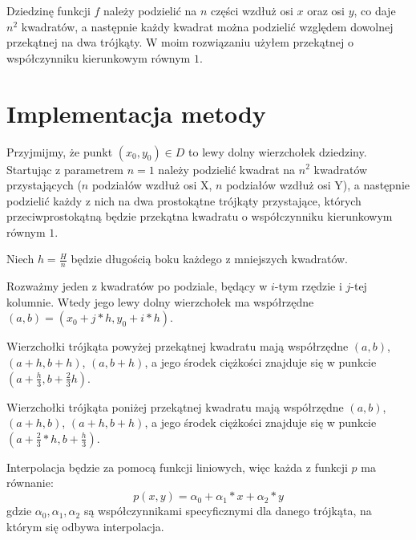 \documentclass[12pt]{article}
\begin{document}
	Dziedzinę funkcji $f$ należy podzielić na $n$ części wzdłuż osi $x$ oraz osi $y$, co daje $n^2$ kwadratów, a następnie każdy kwadrat można podzielić względem dowolnej przekątnej na dwa trójkąty. W moim rozwiązaniu użyłem przekątnej o współczynniku kierunkowym równym $1$.
	
	\section{Implementacja metody}
	Przyjmijmy, że punkt $(x_0, y_0) \in D$ to lewy dolny wierzchołek dziedziny. Startując z parametrem $n = 1$ należy podzielić kwadrat na $n^2$ kwadratów przystających ($n$ podziałów wzdłuż osi X, $n$ podziałów wzdłuż osi Y), a następnie podzielić każdy z nich na dwa prostokątne trójkąty przystające, których przeciwprostokątną będzie przekątna kwadratu o współczynniku kierunkowym równym $1$.
	
	Niech $h = \frac{H}{n}$ będzie długością boku każdego z mniejszych kwadratów.
	
	Rozważmy jeden z kwadratów po podziale, będący w $i$-tym rzędzie i $j$-tej kolumnie. Wtedy jego lewy dolny wierzchołek ma współrzędne $(a, b) = (x_0 + j*h, y_0 + i*h)$.
	
	Wierzchołki trójkąta powyżej przekątnej kwadratu mają współrzędne $(a, b)$, $(a + h, b + h)$, $(a, b + h)$, a jego środek ciężkości znajduje się w punkcie $(a + \frac{h}{3}, b + \frac{2}{3}h)$.
	
	Wierzchołki trójkąta poniżej przekątnej kwadratu mają współrzędne $(a, b)$, $(a + h, b)$, $(a + h, b + h)$, a jego środek ciężkości znajduje się w punkcie $(a + \frac{2}{3}*h, b + \frac{h}{3})$.
	
	Interpolacja będzie za pomocą funkcji liniowych, więc każda z funkcji $p$ ma równanie:
	$$p(x, y) = \alpha_0 + \alpha_1*x + \alpha_2*y$$
	gdzie $\alpha_0, \alpha_1, \alpha_2$ są współczynnikami specyficznymi dla danego trójkąta, na którym się odbywa interpolacja.
	
\end{document}
